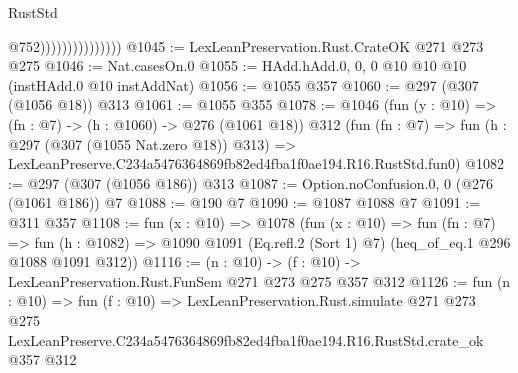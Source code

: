 \begin{lexlean}{RustStd}
\begin{coremodule}
                                  @752)))))))))))))))
@1045 := LexLeanPreservation.Rust.CrateOK @271 @273 @275
@1046 := Nat.casesOn.{0}
@1055 := HAdd.hAdd.{0, 0, 0} @10 @10 @10 (instHAdd.{0} @10 instAddNat)
@1056 := @1055 @357
@1060 := @297 (@307 (@1056 @18)) @313
@1061 := @1055 @355
@1078 := @1046
    (fun (y : @10) => (fn : @7) -> (h : @1060) -> @276 (@1061 @18))
    @312
    (fun (fn : @7) =>
    fun (h : @297 (@307 (@1055 Nat.zero @18)) @313) =>
    LexLeanPreserve.C234a5476364869fb82ed4fba1f0ae194.R16.RustStd.fun0)
@1082 := @297 (@307 (@1056 @186)) @313
@1087 := Option.noConfusion.{0, 0} (@276 (@1061 @186)) @7
@1088 := @190 @7
@1090 := @1087 @1088 @7
@1091 := @311 @357
@1108 := fun (x : @10) =>
  @1078
    (fun (x : @10) =>
    fun (fn : @7) =>
    fun (h : @1082) => @1090 @1091 (Eq.refl.{2} (Sort 1) @7) (heq_of_eq.{1} @296 @1088 @1091 @312))
@1116 := (n : @10) -> (f : @10) -> LexLeanPreservation.Rust.FunSem @271 @273 @275 @357 @312
@1126 := fun (n : @10) =>
  fun (f : @10) =>
  LexLeanPreservation.Rust.simulate
    @271
    @273
    @275
    LexLeanPreserve.C234a5476364869fb82ed4fba1f0ae194.R16.RustStd.crate_ok
    @357
    @312
\end{coremodule}
\end{lexlean}
